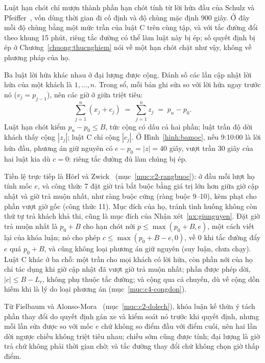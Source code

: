 Luật hạn chót chỉ mượn thành phần hạn chót tính từ lời hứa đầu của Schulz và Pfeiffer~\cite{schulz2026}, vốn
dùng thời gian đi cố định và độ chùng mặc định 900 giây. Ở đây mỗi độ chùng bằng một mức trần của luật C trên cùng
tập, và với tắc đường đổi theo khung 15 phút, riêng tắc đường có thể làm luật này bị ép; số quyết định bị ép ở
Chương~\ref{chuong:thucnghiem} nói về một hạn chót chặt như vậy, không về phương pháp của họ.

Ba luật lời hứa khác nhau ở đại lượng được cộng. Đánh số các lần cập nhật lời hứa của một khách là
$1, \ldots, n$. Trong sổ, mỗi bản ghi sửa so với lời hứa ngay trước nó ($v_j = p_{j-1}$), nên các giờ ở giữa
triệt tiêu:
\begin{equation}
\sum_{j=1}^{n} (x_j + c_j) \;=\; \sum_{j=1}^{n} z_j \;=\; p_n - p_0 .
\label{eq:dongnhat}
\end{equation}
Luật hạn chót kiểm $p_n - p_0 \le B$, tức cộng có dấu cả hai phần; luật trần độ dời khách thấy cộng $|z_j|$; luật
C chỉ cộng $|c_j|$. Ở Hình~\ref{hinh:bamoc}, nếu 9:10:00 là lời hứa đầu, phương án giữ nguyên có
$e - p_0 = |z| = 40$ giây, vượt trần 30 giây của hai luật kia dù $c = 0$: riêng tắc đường đủ làm chúng bị ép.

Tiền lệ trực tiếp là Hörl và Zwick~\cite{horl2022} (mục~\ref{muc:c2-rangbuoc}): ở đầu mỗi lượt họ tính mốc $e$,
và công thức 7 đặt giờ trả bắt buộc bằng giá trị lớn hơn giữa giờ cập nhật và giờ trả muộn nhất, như ràng buộc cứng
(ràng buộc 9--10), kèm phạt cho phần vượt giờ gốc (công thức 11). Mục đích của họ, tránh tình huống không còn thứ tự
trả khách khả thi, cũng là mục đích của Nhận xét~\ref{nx:giunguyen}. Đặt giờ trả muộn nhất là $p_0 + B$ cho hạn chót
nới $p \le \max(p_0 + B, e)$, một cách viết lại của khóa luận; nó cho phép $c \le \max(p_0 + B - e, 0)$, về 0 khi
tắc đường đẩy $e$ quá $p_0 + B$, và cũng không loại phương án giữ nguyên (suy luận, chưa chạy). Luật C khác ở ba chỗ:
một trần cho mọi khách có lời hứa, còn phần nới của họ chỉ tác dụng khi giờ cập nhật đã vượt giờ trả muộn nhất;
phần được phép dời, $|c| \le B - L_r$, không phụ thuộc tắc đường; và cộng qua cả chuyến, dù vế cộng dồn hiếm khi là
lý do loại phương án (mục~\ref{muc:c4-congdon}).

Từ Fielbaum và Alonso-Mora~\cite{fielbaum2020} (mục~\ref{muc:c2-dolech}), khóa luận kế thừa ý tách phần thay đổi
do quyết định gán xe và kiểm soát nó trước khi quyết định, nhưng mỗi lần sửa được so với mốc $e$ chứ không so điểm
đầu với điểm cuối, nên hai lần dời ngược chiều không triệt tiêu nhau; chiều sớm cũng được tính; đại lượng là giờ
trả chứ không phải thời gian chờ; và tắc đường thay đổi chứ không chọn giờ thấp điểm.

